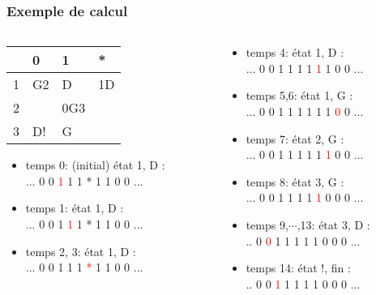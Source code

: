 \begin{frame}
  \frametitle{Exemple de calcul}
\begin{columns}
  \begin{column}{6cm}
\begin{center}  
\renewcommand{\arraystretch}{1.5}
\begin{tabular}{|l|l|l|l|} \hline
  & 0  & 1   & *  \\ \hline
1 & G2 & D   & 1D \\ \hline
2 &    & 0G3 &    \\ \hline
3 & D! & G   &    \\ \hline
\end{tabular} 
\end{center}
\begin{itemize}
  \item temps 0: (initial) état 1, D :\\ ... 0 0 \textcolor{red}{1} 1 1 * 1 1 0 0 ...
  \pause \item temps 1:  état 1, D :\\ ... 0 0 1 \textcolor{red}{1} 1 * 1 1 0 0 ...
  \pause \item temps 2, 3:  état 1, D :\\ ... 0 0 1 1 1 \textcolor{red}{*} 1 1 0 0 ...
\end{itemize}

  \end{column}

  \begin{column}{6cm}
\begin{itemize}
  \pause \item temps 4:  état 1, D :\\ ... 0 0 1 1 1 1 \textcolor{red}{1} 1 0 0 ...
  \pause \item temps 5,6:  état 1, G :\\ ... 0 0 1 1 1 1 1 1 \textcolor{red}{0} 0  ...
  \pause \item temps 7:  état 2, G :\\ ... 0 0 1 1 1 1 1 \textcolor{red}{1} 0 0  ...
  \pause \item temps 8:  état 3, G :\\ ... 0 0 1 1 1 1 \textcolor{red}{1} 0 0 0  ...
  \pause \item temps 9,$\cdots$,13:  état 3, D :\\ .. 0 \textcolor{red}{0} 1 1 1 1 1 0 0 0  ...
  \pause \item temps 14:  état !, fin :\\ .. 0 0 \textcolor{red}{1} 1 1 1 1 0 0 0  ...
\end{itemize}
  \end{column}
\end{columns}
\end{frame}

